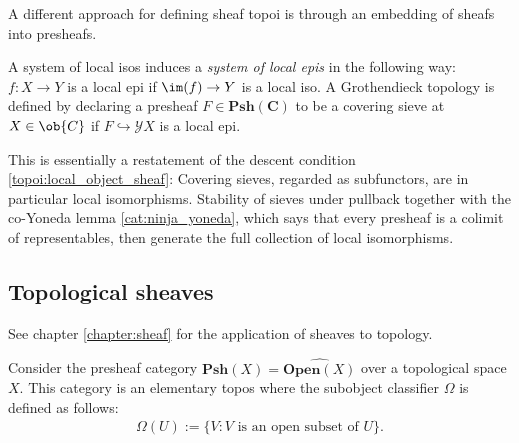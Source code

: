     A different approach for defining sheaf topoi is through an embedding of sheafs into presheafs.
    \begin{property}
        A system of local isos induces a \textit{system of local epis} in the following way: $f:X\rightarrow Y$ is a local epi if $\im(f)\rightarrow Y$ is a local iso. A Grothendieck topology is defined by declaring a presheaf $F\in\mathbf{Psh}(\mathbf{C})$ to be a covering sieve at $X\in\ob{C}$ if $F\hookrightarrow\mathcal{Y}X$ is a local epi.
    \end{property}

    \begin{remark}
        This is essentially a restatement of the descent condition \ref{topoi:local_object_sheaf}: Covering sieves, regarded as subfunctors, are in particular local isomorphisms. Stability of sieves under pullback together with the co-Yoneda lemma \ref{cat:ninja_yoneda}, which says that every presheaf is a colimit of representables, then generate the full collection of local isomorphisms.
    \end{remark}

\subsection{Topological sheaves}

    See chapter \ref{chapter:sheaf} for the application of sheaves to topology.

    \begin{property}\label{topoi:sheaf_topos}
        Consider the presheaf category $\mathbf{Psh}(X) = \widehat{\mathbf{Open}(X)}$ over a topological space $X$. This category is an elementary topos where the subobject classifier $\Omega$ is defined as follows:
        \begin{gather}
            \Omega(U) := \{V:V\text{ is an open subset of }U\}.
        \end{gather}
    \end{property}

